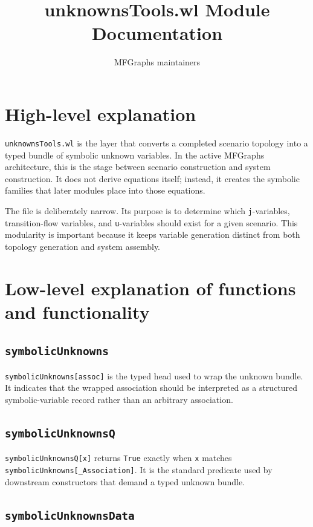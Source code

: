 \documentclass[11pt]{article}
\title{unknownsTools.wl Module Documentation}
\author{MFGraphs maintainers}
\date{}
\begin{document}
\maketitle

\section{High-level explanation}

\texttt{unknownsTools.wl} is the layer that converts a completed scenario topology into a typed bundle of symbolic unknown variables. In the active MFGraphs architecture, this is the stage between scenario construction and system construction. It does not derive equations itself; instead, it creates the symbolic families that later modules place into those equations.

The file is deliberately narrow. Its purpose is to determine which \texttt{j}-variables, transition-flow variables, and \texttt{u}-variables should exist for a given scenario. This modularity is important because it keeps variable generation distinct from both topology generation and system assembly.

\section{Low-level explanation of functions and functionality}

\subsection*{\texttt{symbolicUnknowns}}

\texttt{symbolicUnknowns[assoc]} is the typed head used to wrap the unknown bundle. It indicates that the wrapped association should be interpreted as a structured symbolic-variable record rather than an arbitrary association.

\subsection*{\texttt{symbolicUnknownsQ}}

\texttt{symbolicUnknownsQ[x]} returns \texttt{True} exactly when \texttt{x} matches \texttt{symbolicUnknowns[\_Association]}. It is the standard predicate used by downstream constructors that demand a typed unknown bundle.

\subsection*{\texttt{symbolicUnknownsData}}
\end{document}
